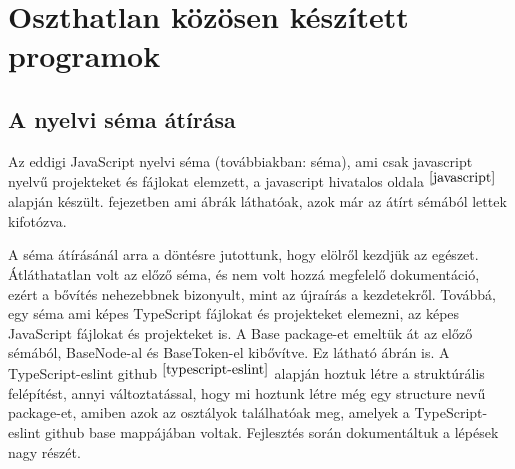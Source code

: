 \chapter{Oszthatlan közösen készített programok}\label{chap:oszthatlan_kozos_dolgok}

\section{A nyelvi séma átírása}

\noindent

Az eddigi JavaScript nyelvi séma (továbbiakban: séma), ami csak javascript nyelvű projekteket és fájlokat elemzett, a javascript hivatalos oldala$^{~\cite{javascript}}$ alapján készült.
 fejezetben ami ábrák láthatóak, azok már az átírt sémából lettek kifotózva.

\noindent

A séma átírásánál arra a döntésre jutottunk, hogy elölről kezdjük az egészet.
Átláthatatlan volt az előző séma, és nem volt hozzá megfelelő dokumentáció, ezért a bővítés nehezebbnek bizonyult, mint az újraírás a kezdetekről.
Továbbá, egy séma ami képes TypeScript fájlokat és projekteket elemezni, az képes JavaScript fájlokat és projekteket is.
A Base package-et emeltük át az előző sémából, BaseNode-al és BaseToken-el kibővítve. Ez látható  ábrán is.
A TypeScript-eslint github$^{~\cite{typescript-eslint}}$ alapján hoztuk létre a struktúrális felépítést,
annyi változtatással, hogy mi hoztunk létre még egy structure nevű package-et, amiben azok az osztályok találhatóak meg, amelyek a TypeScript-eslint github base mappájában voltak.
Fejlesztés során dokumentáltuk a lépések nagy részét.

\noindent

